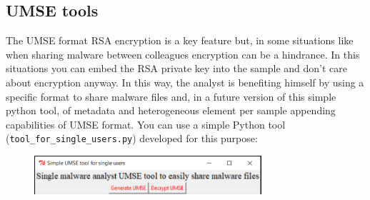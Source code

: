 \subsection{UMSE tools}

The UMSE format RSA encryption is a key feature but, in some situations like
when sharing malware between colleagues encryption can be a hindrance. In this
situations you can embed the RSA private key into the sample and don’t care
about encryption anyway.  In this way, the analyst is benefiting himself by
using a specific format to share malware files and, in a future version of
this simple python tool, of metadata and heterogeneous element per sample
appending capabilities of UMSE format.  You can use a simple Python tool
(\texttt{tool\_for\_single\_users.py}) developed for this purpose:
\begin{figure}[h]
  \centering
  \includegraphics[width=0.75\textwidth]{./figures/UMSETool}
\end{figure}